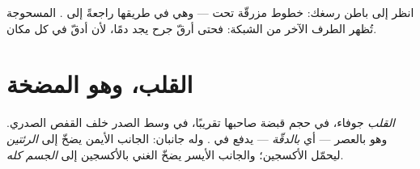 \begin{remark}\label{rem:g4:heart-and-blood:see}
انظر إلى باطن رسغك: خطوط مزرقّة تحت  --- وهي  في
طريقها راجعةً إلى .  المسحوجة تُظهر الطرف الآخر من
الشبكة: فحتى أرقّ جرح يجد دمًا، لأن أدقّ  في كل مكان.
\end{remark}

\section{القلب، وهو المضخة}

\begin{definition}[القلب]\label{def:g4:heart-and-blood:heart}
\emph{القلب}  جوفاء، في حجم قبضة صاحبها تقريبًا، في
وسط الصدر خلف القفص الصدري. وهو بالعصر --- أي \emph{بالدقّة}
--- يدفع  في . وله جانبان: الجانب الأيمن يضخّ
 إلى \emph{الرئتين} ليحمّل الأكسجين؛ والجانب الأيسر يضخّ 
الغني بالأكسجين إلى \emph{الجسم كله}.
\end{definition}

